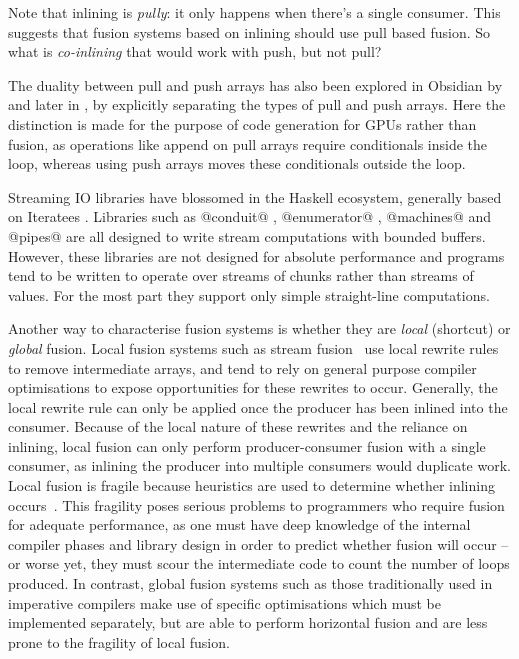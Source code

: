 Note that inlining is \emph{pully}: it only happens when there's a single consumer.
This suggests that fusion systems based on inlining should use pull based fusion.
So what is \emph{co-inlining} that would work with push, but not pull?

The duality between pull and push arrays has also been explored in Obsidian by \citep{claessen2012expressive} and later in \citep{svensson2014defunctionalizing}, by explicitly separating the types of pull and push arrays.
Here the distinction is made for the purpose of code generation for GPUs rather than fusion, as operations like append on pull arrays require conditionals inside the loop, whereas using push arrays moves these conditionals outside the loop.

Streaming IO libraries have blossomed in the Haskell ecosystem, generally based on Iteratees \cite{kiselyov2012iteratees}.
Libraries such as @conduit@ \cite{hackage:conduit}, @enumerator@ \cite{hackage:enumerator}, @machines@ \cite{hackage:machines} and @pipes@ \cite{hackage:pipes} are all designed to write stream computations with bounded buffers.
However, these libraries are not designed for absolute performance and programs tend to be written to operate over streams of chunks rather than streams of values.
For the most part they support only simple straight-line computations.

Another way to characterise fusion systems is whether they are \emph{local} (shortcut) or \emph{global} fusion.
Local fusion systems such as stream fusion~\cite{coutts2007stream} use local rewrite rules to remove intermediate arrays, and tend to rely on general purpose compiler optimisations to expose opportunities for these rewrites to occur.
Generally, the local rewrite rule can only be applied once the producer has been inlined into the consumer.
Because of the local nature of these rewrites and the reliance on inlining, local fusion can only perform producer-consumer fusion with a single consumer, as inlining the producer into multiple consumers would duplicate work.
Local fusion is fragile because heuristics are used to determine whether inlining occurs~\cite{lippmeier2013data}.
This fragility poses serious problems to programmers who require fusion for adequate performance, as one must have deep knowledge of the internal compiler phases and library design in order to predict whether fusion will occur -- or worse yet, they must scour the intermediate code to count the number of loops produced. 
In contrast, global fusion systems such as those traditionally used in imperative compilers make use of specific optimisations which must be implemented separately, but are able to perform horizontal fusion and are less prone to the fragility of local fusion.

